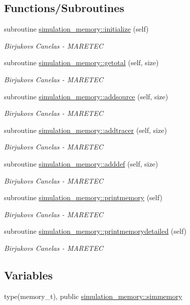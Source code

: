 \subsection*{Functions/\+Subroutines}
\begin{DoxyCompactItemize}
\item 
subroutine \hyperlink{namespacesimulation__memory_a3b8f4e0766c90e6d6bd99e2fa49ea91b}{simulation\+\_\+memory\+::initialize} (self)
\begin{DoxyCompactList}\small\item\em Birjukovs Canelas -\/ M\+A\+R\+E\+T\+EC \end{DoxyCompactList}\item 
subroutine \hyperlink{namespacesimulation__memory_a8589522c4e28cf60741a5439477cdb31}{simulation\+\_\+memory\+::getotal} (self, size)
\begin{DoxyCompactList}\small\item\em Birjukovs Canelas -\/ M\+A\+R\+E\+T\+EC \end{DoxyCompactList}\item 
subroutine \hyperlink{namespacesimulation__memory_acf01ce7bcb2d7571d37fb2c0338e5bd2}{simulation\+\_\+memory\+::addsource} (self, size)
\begin{DoxyCompactList}\small\item\em Birjukovs Canelas -\/ M\+A\+R\+E\+T\+EC \end{DoxyCompactList}\item 
subroutine \hyperlink{namespacesimulation__memory_a4d6c8bd027a99cb6c7f9ad2eb55c744f}{simulation\+\_\+memory\+::addtracer} (self, size)
\begin{DoxyCompactList}\small\item\em Birjukovs Canelas -\/ M\+A\+R\+E\+T\+EC \end{DoxyCompactList}\item 
subroutine \hyperlink{namespacesimulation__memory_a62d5641dbec45bc279575c173b0f0f24}{simulation\+\_\+memory\+::adddef} (self, size)
\begin{DoxyCompactList}\small\item\em Birjukovs Canelas -\/ M\+A\+R\+E\+T\+EC \end{DoxyCompactList}\item 
subroutine \hyperlink{namespacesimulation__memory_a5827bef8479b809a453af147ceaa8c7c}{simulation\+\_\+memory\+::printmemory} (self)
\begin{DoxyCompactList}\small\item\em Birjukovs Canelas -\/ M\+A\+R\+E\+T\+EC \end{DoxyCompactList}\item 
subroutine \hyperlink{namespacesimulation__memory_af2a472000acc1ff59cb6e63679617699}{simulation\+\_\+memory\+::printmemorydetailed} (self)
\begin{DoxyCompactList}\small\item\em Birjukovs Canelas -\/ M\+A\+R\+E\+T\+EC \end{DoxyCompactList}\end{DoxyCompactItemize}
\subsection*{Variables}
\begin{DoxyCompactItemize}
\item 
type(memory\+\_\+t), public \hyperlink{namespacesimulation__memory_a8ed2bc20b0c49405084442d02fc76d42}{simulation\+\_\+memory\+::simmemory}
\end{DoxyCompactItemize}
